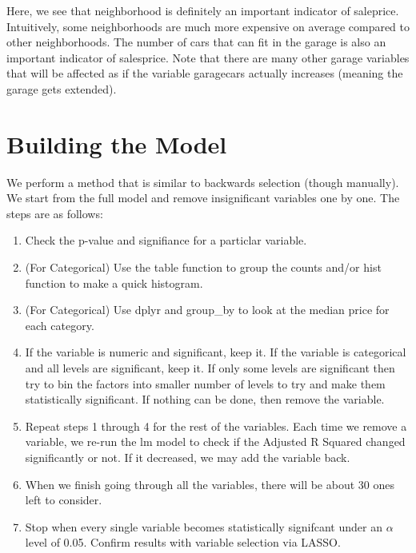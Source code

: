 \documentclass[12pt]{article}
\begin{document}
\begin{flushleft}
\begin{flushleft}
Here, we see that neighborhood is definitely an important indicator of saleprice. Intuitively, some neighborhoods are much more expensive on average compared to other neighborhoods. The number of cars that can fit in the garage is also an important indicator of salesprice. Note that there are many other garage variables that will be affected as if the variable garagecars actually increases (meaning the garage gets extended).
\end{flushleft}

\centering
\section{Building the Model}
\begin{flushleft}
We perform a method that is similar to backwards selection (though manually). We start from the full model and remove insignificant variables one by one. The steps are as follows:
\end{flushleft}
\begin{enumerate}

\item Check the p-value and signifiance for a particlar variable.
\item (For Categorical) Use the table function to group the counts and/or hist function to make a quick histogram. 
\item (For Categorical) Use dplyr and group\_by to look at the median price for each category.
\item If the variable is numeric and significant, keep it. If the variable is categorical and all levels are significant, keep it. If only some levels are significant then try to bin the factors into smaller number of levels to try and make them statistically significant. If nothing can be done, then remove the variable.
\item Repeat steps 1 through 4 for the rest of the variables. Each time we remove a variable, we re-run the lm model to check if the Adjusted R Squared changed significantly or not. If it decreased, we may add the variable back.
\item When we finish going through all the variables, there will be about 30 ones left to consider.
\item Stop when every single variable becomes statistically signifcant under an $\alpha$ level of 0.05. Confirm results with variable selection via LASSO.
\end{enumerate}


\end{flushleft}
\end{document}
